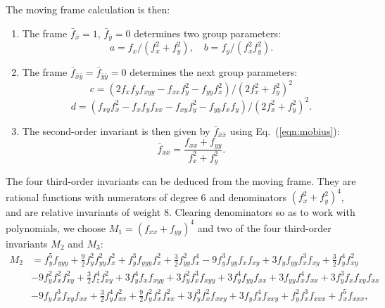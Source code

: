 \documentclass[review,onefignum,onetabnum]{siamonline190516}
\begin{document}
The moving frame calculation is then:
\begin{enumerate}
\item The frame $\bar f_{\bar x}=1$, $\bar f_{\bar y}=0$ determines two group parameters:
$$ a = f_x/(f_x^2 + f_y^2),\quad b = f_y/(f_x^2 f_y^2).$$

\item The frame $\bar f_{\bar x \bar y}=\bar f_{\bar y \bar y}=0$ determines the next group parameters:
$$ c = (2 f_xf_yf_{xyy} - f_{xx}f_y^2 - f_{yy}f_x^2)/(2 f_x^2 + f_y^2)^2$$
$$ d = (f_{xy}f_x^2 - f_x f_y f_{xx} - f_{xy}f_y^2 - f_{yy} f_x f_y)/(2 f_x^2 + f_y^2)^2.$$

\item The second-order invariant is then given by $\bar f_{\bar x \bar x}$ using Eq.~(\ref{eqn:mobius}):
$$\bar f_{\bar x \bar x} = \frac{f_{xx}+f_{yy}}{f_x^2 + f_y^2}.$$
\end{enumerate}


The four third-order invariants can be deduced from the moving frame. They
are rational functions with numerators of degree 6 and denominators $(f_x^2
+ f_y^2)^4$, and are relative invariants of weight 8.  Clearing
denominators so as to work with polynomials, we choose $M_1 = (f_{xx} +
f_{yy})^4$ and two of the four third-order invariants $M_2$ and $M_3$:
\begin{align*} M_2&=
f_y ^5 f_{yyy} + \frac{9}{2} f_y ^2 f_{yy}^2 f_x ^2 + 
 f_y ^3 f_{yyy} f_x ^2 + \frac{3}{2} f_{yy}^2 f_x ^4 - 
 9 f_y ^3 f_{yy} f_x  f_{xy} + 
 3 f_y  f_{yy} f_x ^3 f_{xy} + \frac{3}{2} f_y ^4 f_{xy}^2 \\ \nonumber
 &- 9 f_y ^2 f_x ^2 f_{xy}^2 
+ \frac{3}{2} f_z ^4 f_{xy}^2 + 
 3 f_y ^4 f_x  f_{xyy} + 3 f_y ^2 f_x ^3 f_{xyy} + 
 3 f_y ^4 f_{yy} f_{xx} + 3 f_{yy} f_x ^4 f_{xx} + 
 3 f_y ^3 f_x  f_{xy} f_{xx} \\ \nonumber
&- 9 f_y  f_x ^3 f_{xy} f_{xx} 
+ \frac{3}{2} f_y ^4 f_{xx}^2 + 
 \frac{9}{2} f_y ^2 f_x ^2 f_{xx}^2 + 3 f_y ^3 f_x ^2 f_{xxy} + 
 3 f_y  f_x ^4 f_{xxy} + f_y ^2 f_x ^3 f_{xxx} + 
 f_x ^5 f_{xxx}, 
\end{align*}
 
\end{document}
